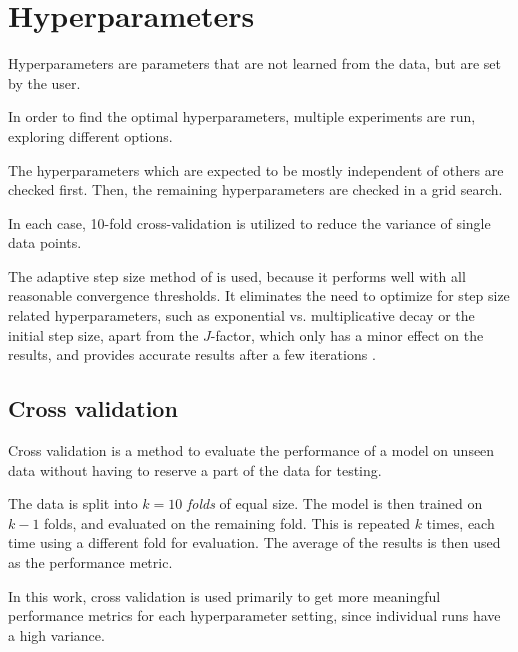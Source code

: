 \section{Hyperparameters}
Hyperparameters are parameters that are not learned from the data,
but are set by the user.

In order to find the optimal hyperparameters,
multiple experiments are run,
exploring different options.

The hyperparameters which are expected to be mostly independent of others are checked first.
Then, the remaining hyperparameters are checked in a grid search. %

In each case, 10-fold cross-validation is utilized to reduce the variance of single data points.

The adaptive step size method of \dseaplus is used,
because it performs well with all reasonable convergence thresholds.
It eliminates the need to optimize for step size related hyperparameters,
  such as
    exponential vs. multiplicative decay
    or the initial step size,
  apart from the $J$-factor,
    which only has a minor effect on the results,
and provides accurate results after a few iterations \cite{dsea_mirko}.



\subsection{Cross validation}
Cross validation is a method to evaluate the performance of a model on unseen data
without having to reserve a part of the data for testing.

The data is split into $k = 10$ \emph{folds} of equal size.
The model is then trained on $k-1$ folds,
and evaluated on the remaining fold.
This is repeated $k$ times,
each time using a different fold for evaluation.
The average of the results is then used as the performance metric.

In this work,
cross validation is used primarily to get more meaningful performance metrics
for each hyperparameter setting,
since individual runs have a high variance.


